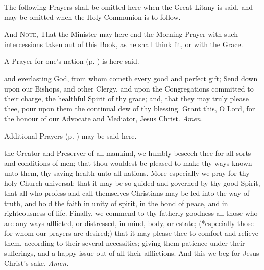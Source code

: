  \begin{rubric}
     The following Prayers shall be omitted here when the Great Litany is said, and may be omitted when the Holy Communion is to follow.
 \end{rubric}
\begin{rubric}
    And \textsc{Note}, That the Minister may here end the Morning Prayer with such intercessions taken out of this Book, as he shall think fit, or with the Grace.
\end{rubric}
\vspace{-2ex}
\begin{rubric}
    A Prayer for one's nation (p. \pageref{prayers}) is here said.
\end{rubric}
\vspace{-2ex}
 and everlasting God, from whom cometh every good and perfect gift; Send down upon our Bishops, and other Clergy, and upon the Congregations committed to their charge, the healthful Spirit of thy grace; and, that they may truly please thee, pour upon them the continual dew of thy blessing. Grant this, O Lord, for the honour of our Advocate and Mediator, Jesus Christ. \textit{Amen.}
\begin{rubric}
    Additional Prayers (p. \pageref{prayers}) may be said here.
\end{rubric}
\vspace{-2ex}
 the Creator and Preserver of all mankind, we humbly beseech thee for all sorts and conditions of men; that thou wouldest be pleased to make thy ways known unto them, thy saving health unto all nations. More especially we pray for thy holy Church universal; that it may be so guided and governed by thy good Spirit, that all who profess and call themselves Christians may be led into the way of truth, and hold the faith in unity of spirit, in the bond of peace, and in righteousness of life. Finally, we commend to thy fatherly goodness all those who are any ways afflicted, or distressed, in mind, body, or estate; (*especially those for whom our prayers are desired;) that it may please thee to comfort and relieve them, according to their several necessities; giving them patience under their sufferings, and a happy issue out of all their afflictions. And this we beg for Jesus Christ's sake. \textit{Amen.}

